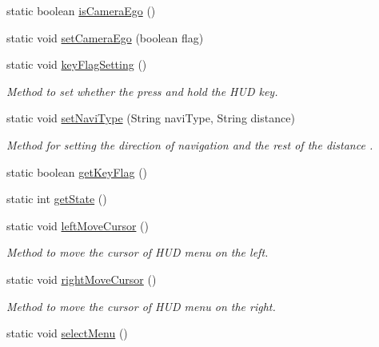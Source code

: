 \begin{DoxyCompactItemize}
static boolean \hyperlink{classkr_1_1ac_1_1kookmin_1_1cs_1_1hud_1_1_h_u_d_management_acaf22b9e65e755c7504cf7d58b4e61c5}{is\+Camera\+Ego} ()
\item 
static void \hyperlink{classkr_1_1ac_1_1kookmin_1_1cs_1_1hud_1_1_h_u_d_management_ab216b1d334e23a1eac3b2ba468f420da}{set\+Camera\+Ego} (boolean flag)
\item 
static void \hyperlink{classkr_1_1ac_1_1kookmin_1_1cs_1_1hud_1_1_h_u_d_management_aee0e46bbcf6e6db490490c48fc32498a}{key\+Flag\+Setting} ()
\begin{DoxyCompactList}\small\item\em Method to set whether the press and hold the H\+U\+D key. \end{DoxyCompactList}\item 
static void \hyperlink{classkr_1_1ac_1_1kookmin_1_1cs_1_1hud_1_1_h_u_d_management_ae9d4e81f2a9e51e0269f80d6c0b192ff}{set\+Navi\+Type} (String navi\+Type, String distance)
\begin{DoxyCompactList}\small\item\em Method for setting the direction of navigation and the rest of the distance . \end{DoxyCompactList}\item 
static boolean \hyperlink{classkr_1_1ac_1_1kookmin_1_1cs_1_1hud_1_1_h_u_d_management_ae13f71ba28cbace432c6991b05e3389b}{get\+Key\+Flag} ()
\item 
static int \hyperlink{classkr_1_1ac_1_1kookmin_1_1cs_1_1hud_1_1_h_u_d_management_ae53c044c1e3f19918e4594266629f4cf}{get\+State} ()
\item 
static void \hyperlink{classkr_1_1ac_1_1kookmin_1_1cs_1_1hud_1_1_h_u_d_management_a03e741a1bf315bb7cccc881479731038}{left\+Move\+Cursor} ()
\begin{DoxyCompactList}\small\item\em Method to move the cursor of H\+U\+D menu on the left. \end{DoxyCompactList}\item 
static void \hyperlink{classkr_1_1ac_1_1kookmin_1_1cs_1_1hud_1_1_h_u_d_management_abaa831b57d11f6e159917476881112e1}{right\+Move\+Cursor} ()
\begin{DoxyCompactList}\small\item\em Method to move the cursor of H\+U\+D menu on the right. \end{DoxyCompactList}\item 
static void \hyperlink{classkr_1_1ac_1_1kookmin_1_1cs_1_1hud_1_1_h_u_d_management_a454c18c087d019b055fda4a631720819}{select\+Menu} ()

\end{DoxyCompactItemize}
